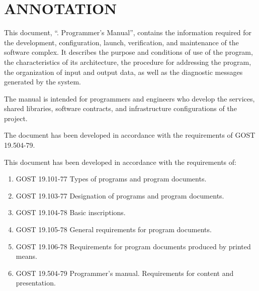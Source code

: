 \documentclass[12pt,a4paper]{extarticle}
\begin{document}
\sloppy




\section*{ANNOTATION}

This document, \enquote{\hseProjectName. Programmer's Manual}, contains the information required for the development, configuration, launch, verification, and maintenance of the software complex. It describes the purpose and conditions of use of the program, the characteristics of its architecture, the procedure for addressing the program, the organization of input and output data, as well as the diagnostic messages generated by the system.

The manual is intended for programmers and engineers who develop the services, shared libraries, software contracts, and infrastructure configurations of the project.

The document has been developed in accordance with the requirements of GOST 19.504-79\cite{gost19504}.

\clearpage

\noindent
This document has been developed in accordance with the requirements of:

\begin{enumerate}[label=\arabic*), leftmargin=1.25cm]
  \item GOST 19.101-77 Types of programs and program documents\cite{gost19101}.
  \item GOST 19.103-77 Designation of programs and program documents\cite{gost19103}.
  \item GOST 19.104-78 Basic inscriptions\cite{gost19104}.
  \item GOST 19.105-78 General requirements for program documents\cite{gost19105}.
  \item GOST 19.106-78 Requirements for program documents produced by
        printed means\cite{gost19106}.
  \item GOST 19.504-79 Programmer's manual. Requirements for content
        and presentation\cite{gost19504}.
\end{enumerate}
\end{document}
